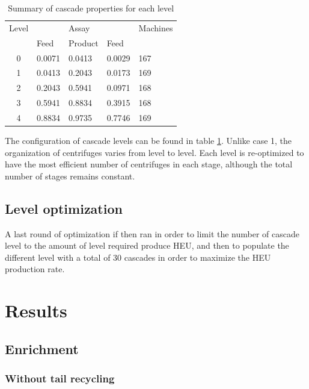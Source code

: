 \documentclass{anstrans}
\begin{document}
\begin{table}[htb]
\centering
\begin{tabular}{cllll}
\toprule

Level   &           & Assay     &       & Machines  \\
        & Feed      & Product   & Feed  &           \\
\midrule
0       & 0.0071    & 0.0413    & 0.0029 & 167       \\
1       & 0.0413    & 0.2043    & 0.0173 & 169       \\
2       & 0.2043    & 0.5941    & 0.0971 & 168       \\
3       & 0.5941    & 0.8834    & 0.3915 & 168       \\
4       & 0.8834    & 0.9735    & 0.7746 & 169       \\

\bottomrule
\end{tabular}
  \caption{Summary of cascade properties for each level}
  \label{tab:cascadelvl}
\end{table}

The configuration of cascade levels can be found in table
\ref{tab:cascadelvl}. Unlike case 1, the organization of centrifuges varies from
level to level. Each level is re-optimized to have the most efficient number of
centrifuges in each stage, although the total number of stages remains constant.


\subsection{Level optimization}

A last round of optimization if then ran in order to limit the number of cascade
level to the amount of level required produce HEU, and then to populate the
different level with a total of 30 cascades in order to maximize the HEU
production rate.

\section{Results}
\subsection{Enrichment}
\subsubsection{Without tail recycling}
\end{document}
